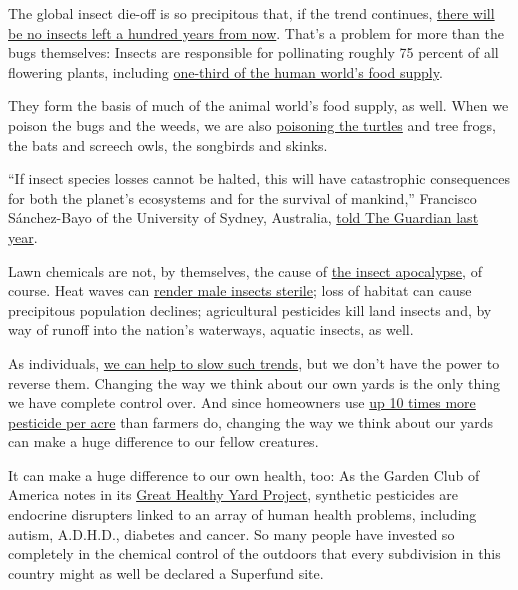 The global insect die-off is so precipitous that, if the trend
continues,
\href{https://www.plantbasednews.org/news/insects-facing-extinction-within-100-years}{there
will be no insects left a hundred years from now}. That's a problem for
more than the bugs themselves: Insects are responsible for pollinating
roughly 75 percent of all flowering plants, including
\href{https://www.nationalgeographic.com/animals/2019/02/why-insect-populations-are-plummeting-and-why-it-matters/}{one-third
of the human world's food supply}.

They form the basis of much of the animal world's food supply, as well.
When we poison the bugs and the weeds, we are also
\href{https://www.instagram.com/p/CAEKJq8BNPr/}{poisoning the turtles}
and tree frogs, the bats and screech owls, the songbirds and skinks.

``If insect species losses cannot be halted, this will have catastrophic
consequences for both the planet's ecosystems and for the survival of
mankind,'' Francisco Sánchez-Bayo of the University of Sydney,
Australia,
\href{https://www.theguardian.com/environment/2019/feb/10/plummeting-insect-numbers-threaten-collapse-of-nature}{told
The Guardian last year}.

Lawn chemicals are not, by themselves, the cause of
\href{https://www.nytimes3xbfgragh.onion/2018/11/27/magazine/insect-apocalypse.html}{the
insect apocalypse}, of course. Heat waves can
\href{https://www.theguardian.com/environment/2018/nov/13/heatwaves-wipe-out-male-insect-fertility-beetles-study}{render
male insects sterile}; loss of habitat can cause precipitous population
declines; agricultural pesticides kill land insects and, by way of
runoff into the nation's waterways, aquatic insects, as well.

As individuals,
\href{https://www.nytimes3xbfgragh.onion/2020/01/13/opinion/earth-environmentalism.html?searchResultPosition=1}{we
can help to slow such trends}, but we don't have the power to reverse
them. Changing the way we think about our own yards is the only thing we
have complete control over. And since homeowners use
\href{https://www.fws.gov/dpps/visualmedia/printingandpublishing/publications/2003_HomeownersGuidetoProtectingFrogs.pdf}{up
10 times more pesticide per acre} than farmers do, changing the way we
think about our yards can make a huge difference to our fellow
creatures.

It can make a huge difference to our own health, too: As the Garden Club
of America notes in its \href{http://tghyp.com/468-revision-v1/}{Great
Healthy Yard Project}, synthetic pesticides are endocrine disrupters
linked to an array of human health problems, including autism, A.D.H.D.,
diabetes and cancer. So many people have invested so completely in the
chemical control of the outdoors that every subdivision in this country
might as well be declared a Superfund site.

